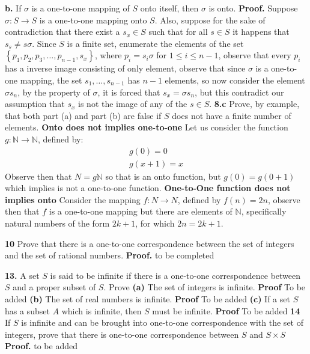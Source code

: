 \documentclass[11pt,a4paper]{article}
\begin{document}
\textbf{b.} If $\sigma$ is a one-to-one mapping of $S$ onto itself, then $\sigma$ is onto.
\textbf{Proof.} Suppose $ \sigma: S \rightarrow S$ is a one-to-one mapping onto $S$. Also, suppose for the sake of contradiction that there exist a $s_x \in S$ such that for all $s \in S$ it happens that $ s_s \neq s\sigma $. Since $S$ is a finite set, enumerate the elements of the set $ \left\lbrace p_1, p_2, p_3, \ldots, p_{n-1}, s_x \right\rbrace $, where $ p_i = s_i\sigma $ for $1 \leq i \leq n-1$, observe that every $p_i$ has a inverse image consisting of only element, observe that since $ \sigma $ is a one-to-one mapping, the set $ s_1, \ldots, s_{n-1} $ has $n-1$ elements, so now consider the element $\sigma s_n$, by the property of $ \sigma$, it is forced that $s_x = \sigma s_n$, but this contradict our assumption that $ s_x $ is not the image of any of the $s \in S$. \newline
\textbf{8.c} Prove, by example, that both part (a) and part (b) are false if $S$ does not have a finite number of elements. \newline
\textbf{Onto does not implies one-to-one} Let us consider the function $g: \mathbb{N} \rightarrow \mathbb{N} $, defined by:
\begin{align*}
	g(0) = 0 \\
	g(x + 1) = x
\end{align*}
Observe then that $ N = g\mathbb{N} $ so that is an onto function, but $ g(0) = g(0 + 1) $ which implies is not a one-to-one function. \newline
\textbf{One-to-One function does not implies onto} Consider the mapping $f: N \rightarrow N $, defined by $ f(n) = 2n $, observe then that $f$ is a one-to-one mapping but there are elements of $ \mathbb{N} $, specifically natural numbers of the form $2k +1 $, for which $2n = 2k + 1 $. \newline

\textbf{10} Prove that there is a one-to-one correspondence between the set of integers and the set of rational numbers. \newline
\textbf{Proof.}
to be completed \par
\textbf{13.} A set $S$ is said to be infinite if there is a one-to-one correspondence between $S$ and a proper subset of $S$. Prove \newline
\textbf{(a)} The set of integers is infinite. \newline
\textbf{Proof} To be added \newline
\textbf{(b)} The set of real numbers is infinite. \newline
\textbf{Proof} To be added \newline
\textbf{(c)} If a set $S$ has a subset $A$ which is infinite, then $S$ must be infinite. \newline
\textbf{Proof} To be added \newline
\textbf{14} If $S$ is infinite and can be brought into one-to-one correspondence with the set of integers, prove that there is one-to-one correspondence between $S$ and $ S \times S$ \newline
\textbf{Proof.}
to be added \newline
\end{document}
